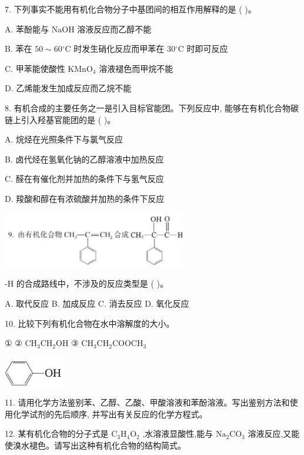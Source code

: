 \documentclass[10pt]{article}
\begin{document}
7. 下列事实不能用有机化合物分子中基团间的相互作用解释的是 ( )。

A. 苯酚能与 \(\mathrm{{NaOH}}\) 溶液反应而乙醇不能

B. 苯在 \({50} \sim {60}{}^{ \circ }\mathrm{C}\) 时发生硝化反应而甲苯在 \({30}{}^{ \circ }\mathrm{C}\) 时即可反应

C. 甲苯能使酸性 \({\mathrm{{KMnO}}}_{4}\) 溶液褪色而甲烷不能

D. 乙烯能发生加成反应而乙烷不能

8. 有机合成的主要任务之一是引入目标官能团。下列反应中, 能够在有机化合物碳链上引入羟基官能团的是 ( )。

A. 烷烃在光照条件下与氯气反应

B. 卤代烃在氢氧化钠的乙醇溶液中加热反应

C. 醛在有催化剂并加热的条件下与氢气反应

D. 羧酸和醇在有浓硫酸并加热的条件下反应

\begin{center}
\includegraphics[max width=0.6\textwidth]{images/0190efc5-b58a-7c43-bfb0-e0a030df9cfd_100_298527.jpg}
\end{center}

-H 的合成路线中，不涉及的反应类型是 ( )。

A. 取代反应 B. 加成反应 C. 消去反应 D. 氧化反应

10. 比较下列有机化合物在水中溶解度的大小。

① ② \({\mathrm{{CH}}}_{3}{\mathrm{{CH}}}_{2}\mathrm{{OH}}\) ③ \({\mathrm{{CH}}}_{3}{\mathrm{{CH}}}_{2}{\mathrm{{COOCH}}}_{3}\)

\begin{center}
\includegraphics[max width=0.2\textwidth]{images/0190efc5-b58a-7c43-bfb0-e0a030df9cfd_101_526386.jpg}
\end{center}

11. 请用化学方法鉴别苯、乙醇、乙酸、甲酸溶液和苯酚溶液。写出鉴别方法和使用化学试剂的先后顺序, 并写出有关反应的化学方程式。

12. 某有机化合物的分子式是 \({\mathrm{C}}_{3}{\mathrm{H}}_{4}{\mathrm{O}}_{2}\) ,水溶液显酸性,能与 \({\mathrm{{Na}}}_{2}{\mathrm{{CO}}}_{3}\) 溶液反应,又能使溴水褪色。请写出这种有机化合物的结构简式。
\end{document}
